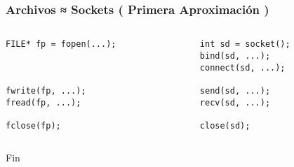 \documentclass{beamer}
\begin{document}

\begin{frame}[fragile]
    \frametitle{Archivos ≈ Sockets ( Primera Aproximaci\'on )}
    \begin{columns}
        \begin{column}{0.5\textwidth}
            \begin{verbatim}
FILE* fp = fopen(...);



fwrite(fp, ...);
fread(fp, ...);

fclose(fp);    
            \end{verbatim}        
        \end{column}
        \begin{column}{0.5\textwidth}
            \begin{verbatim}
int sd = socket();
bind(sd, ...);
connect(sd, ...);

send(sd, ...);
recv(sd, ...);

close(sd);
            \end{verbatim}
        \end{column}
    \end{columns}
\end{frame}


\begin{frame}
\Huge{\centerline{Fin}}
\end{frame}

\end{document}
